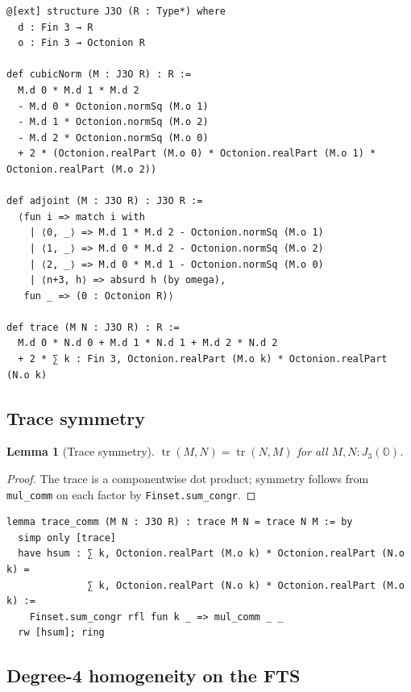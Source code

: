 \documentclass[11pt]{article}
\newtheorem{lemma}[theorem]{Lemma}
\theoremstyle{definition}
\DeclareMathOperator{\tr}{tr}
\newcommand{\OO}{\mathbb{O}}
\newcommand{\Jthree}{J_3(\OO)}
\begin{document}
\begin{lstlisting}[language=leanL,caption={J3(O) model, cubic norm, adjoint, trace
  (GKN\_I4\_State56\_CommRing.lean).}]
@[ext] structure J3O (R : Type*) where
  d : Fin 3 → R
  o : Fin 3 → Octonion R

def cubicNorm (M : J3O R) : R :=
  M.d 0 * M.d 1 * M.d 2
  - M.d 0 * Octonion.normSq (M.o 1)
  - M.d 1 * Octonion.normSq (M.o 2)
  - M.d 2 * Octonion.normSq (M.o 0)
  + 2 * (Octonion.realPart (M.o 0) * Octonion.realPart (M.o 1) * Octonion.realPart (M.o 2))

def adjoint (M : J3O R) : J3O R :=
  ⟨fun i => match i with
    | ⟨0, _⟩ => M.d 1 * M.d 2 - Octonion.normSq (M.o 1)
    | ⟨1, _⟩ => M.d 0 * M.d 2 - Octonion.normSq (M.o 2)
    | ⟨2, _⟩ => M.d 0 * M.d 1 - Octonion.normSq (M.o 0)
    | ⟨n+3, h⟩ => absurd h (by omega),
   fun _ => (0 : Octonion R)⟩

def trace (M N : J3O R) : R :=
  M.d 0 * N.d 0 + M.d 1 * N.d 1 + M.d 2 * N.d 2
  + 2 * ∑ k : Fin 3, Octonion.realPart (M.o k) * Octonion.realPart (N.o k)
\end{lstlisting}

\subsection{Trace symmetry}
\label{sec:fts56-trace}

\begin{lemma}[Trace symmetry]\label{lem:tracecomm}
$\tr(M,N)=\tr(N,M)$ for all $M,N:\Jthree$.
\end{lemma}
\begin{proof}
The trace is a componentwise dot product; symmetry follows from
\texttt{mul\_comm} on each factor by \texttt{Finset.sum\_congr}.
\end{proof}

\begin{lstlisting}[language=leanL,caption={Trace symmetry and bilinearity
  (GKN\_I4\_State56\_CommRing.lean).}]
lemma trace_comm (M N : J3O R) : trace M N = trace N M := by
  simp only [trace]
  have hsum : ∑ k, Octonion.realPart (M.o k) * Octonion.realPart (N.o k) =
              ∑ k, Octonion.realPart (N.o k) * Octonion.realPart (M.o k) :=
    Finset.sum_congr rfl fun k _ => mul_comm _ _
  rw [hsum]; ring
\end{lstlisting}

\subsection{Degree-4 homogeneity on the FTS}
\label{sec:fts56-hom}
\end{document}
